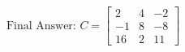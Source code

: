 \documentclass[preview]{standalone}
\begin{document}
\begin{align*}
\text{Final Answer: } C = \begin{bmatrix} 2 & 4 & -2 \\ -1 & 8 & -8 \\ 16 & 2 & 11 \end{bmatrix}
\end{align*}
\end{document}
